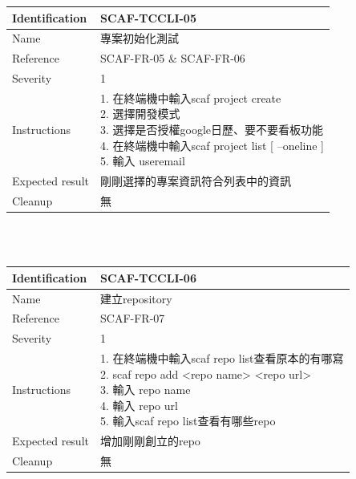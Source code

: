\documentclass{report}
\begin{document}
\begin{tabularx}{\textwidth}{
  |p{}%
  |p{}|%
  }
  \hline
  \centering Identification &  SCAF-TCCLI-05 \\
  \hline
  \centering Name & 專案初始化測試 \\
  \hline
  \centering Reference & SCAF-FR-05 \& SCAF-FR-06 \\
  \hline
  \centering Severity & 1 \\
  \hline
  \centering Instructions & 
  \makecell[l]{
    1. 在終端機中輸入scaf project create \\
    2. 選擇開發模式 \\
    3. 選擇是否授權google日歷、要不要看板功能 \\
    4. 在終端機中輸入scaf project list [ --oneline ]  \\
    5. 輸入 useremail \\
  }\\
  \hline
  \centering Expected result & 剛剛選擇的專案資訊符合列表中的資訊 \\
  \hline
  \centering Cleanup & 無 \\
  \hline
\end{tabularx}
\\
\newline
\\


\begin{tabularx}{\textwidth}{
  |p{}%
  |p{}|%
  }
  \hline
  \centering Identification &  SCAF-TCCLI-06 \\
  \hline
  \centering Name & 建立repository \\
  \hline
  \centering Reference & SCAF-FR-07 \\
  \hline
  \centering Severity & 1 \\
  \hline
  \centering Instructions & 
  \makecell[l]{
    1. 在終端機中輸入scaf repo list查看原本的有哪寫 \\
    2. scaf repo add <repo name> <repo url> \\
    3. 輸入 repo name \\
    4. 輸入 repo url \\
    5. 輸入scaf repo list查看有哪些repo \\
  }\\
  \hline
  \centering Expected result & 增加剛剛創立的repo \\
  \hline
  \centering Cleanup & 無 \\
  \hline
\end{tabularx}
\\
\newline
\\
\end{document}
